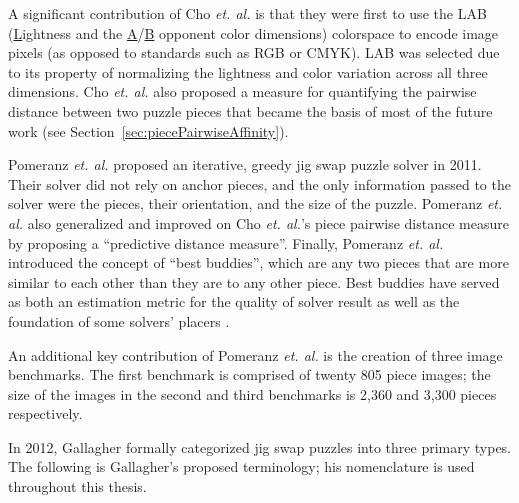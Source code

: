 \documentclass{report}
\begin{document}
A significant contribution of Cho \textit{et. al.} is that they were first to use the LAB  (\underline{L}ightness and the \underline{A}/\underline{B} opponent color dimensions) colorspace to encode image pixels (as opposed to standards such as RGB or CMYK).  LAB was selected due to its property of normalizing the lightness and color variation across all three dimensions.  Cho \textit{et. al.} also proposed a measure for quantifying the pairwise distance between two puzzle pieces that became the basis of most of the future work (see Section~\ref{sec:piecePairwiseAffinity}).  

Pomeranz \textit{et. al.} \cite{pomeranz2011} proposed an iterative, greedy jig swap puzzle solver in 2011.  Their solver did not rely on anchor pieces, and the only information passed to the solver were the pieces, their orientation, and the size of the puzzle.  Pomeranz \textit{et. al.} also generalized and improved on Cho \textit{et. al.}'s piece pairwise distance measure by proposing a ``predictive distance measure''.  Finally, Pomeranz \textit{et. al.} introduced the concept of ``best buddies'', which are any two pieces that are more similar to each other than they are to any other piece.  Best buddies have served as both an estimation metric for the quality of solver result as well as the foundation of some solvers' placers \cite{paikin2015}.

An additional key contribution of Pomeranz \textit{et. al.} is the creation of three image benchmarks.  The first benchmark is comprised of twenty 805 piece images; the size of the images in the second and third benchmarks is 2,360 and 3,300 pieces respectively.

In 2012, Gallagher \cite{gallagher2012} formally categorized jig swap puzzles into three primary types.  The following is Gallagher's proposed terminology; his nomenclature is used throughout this thesis.
\end{document}
